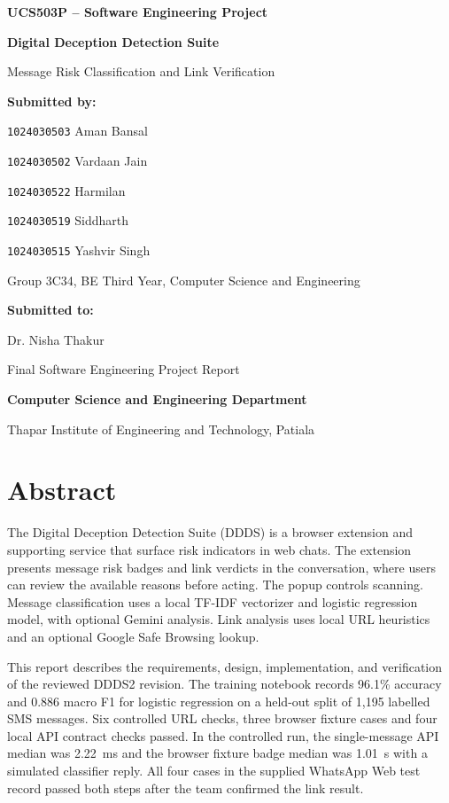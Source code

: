 \documentclass[12pt,letterpaper,twoside,openany]{book}
\makeatletter
\newcommand{\DDDSCourse}{UCS503P -- Software Engineering Project}
\newcommand{\DDDSTitle}{Digital Deception Detection Suite}
\newcommand{\DDDSSubtitle}{Message Risk Classification and Link Verification}
\newcommand{\DDDSAuthors}{\texttt{1024030503} Aman Bansal\par
  \texttt{1024030502} Vardaan Jain\par
  \texttt{1024030522} Harmilan\par
  \texttt{1024030519} Siddharth\par
  \texttt{1024030515} Yashvir Singh}
\newcommand{\DDDSProgramme}{Group 3C34, BE Third Year, Computer Science and Engineering}
\newcommand{\DDDSAdvisor}{Dr. Nisha Thakur}
\newcommand{\DDDSEvaluation}{Final Software Engineering Project Report}
\renewcommand{\frontmatter}{%
  \clearpage\@mainmatterfalse\pagenumbering{roman}%
}
\makeatother
\begin{document}
\hypersetup{pageanchor=false}
\begin{titlepage}
  \centering
  \vspace*{0.30in}
  {\Large\bfseries \DDDSCourse\par}
  \vspace{0.68in}
  {\LARGE\bfseries \DDDSTitle\par}
  \vspace{0.13in}
  {\large \DDDSSubtitle\par}
  \vspace{1.29in}
  {\Large\bfseries Submitted by:\par}
  \vspace{0.12in}
  {\Large \DDDSAuthors\par}
  \vspace{0.14in}
  {\large \DDDSProgramme\par}
  \vfill
  {\Large\bfseries Submitted to:\par}
  \vspace{0.10in}
  {\large \DDDSAdvisor\par}
  \vfill
  {\large\DDDSEvaluation\par}
  {\large\bfseries Computer Science and Engineering Department\par}
  {\large Thapar Institute of Engineering and Technology, Patiala\par}
\end{titlepage}

\frontmatter
\hypersetup{pageanchor=true}

\chapter*{Abstract}
{}

The Digital Deception Detection Suite (DDDS) is a browser extension and supporting service that surface risk indicators in web chats. The extension presents message risk badges and link verdicts in the conversation, where users can review the available reasons before acting. The popup controls scanning. Message classification uses a local TF-IDF vectorizer and logistic regression model, with optional Gemini analysis. Link analysis uses local URL heuristics and an optional Google Safe Browsing lookup.

This report describes the requirements, design, implementation, and verification of the reviewed DDDS2 revision. The training notebook records 96.1\% accuracy and 0.886 macro F1 for logistic regression on a held-out split of 1,195 labelled SMS messages. Six controlled URL checks, three browser fixture cases and four local API contract checks passed. In the controlled run, the single-message API median was 2.22~ms and the browser fixture badge median was 1.01~s with a simulated classifier reply. All four cases in the supplied WhatsApp Web test record passed both steps after the team confirmed the link result.
\end{document}
